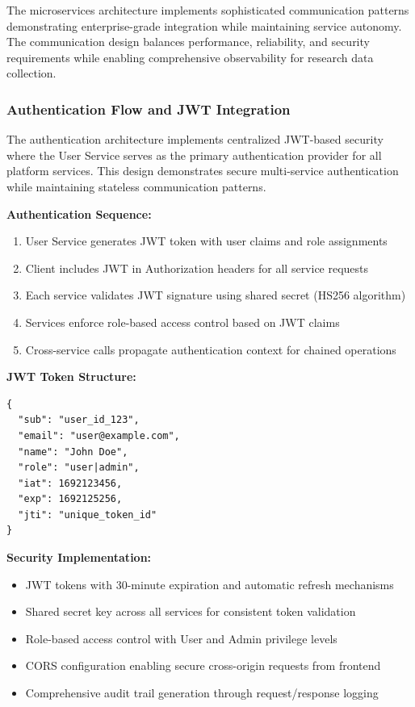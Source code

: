 The microservices architecture implements sophisticated communication patterns demonstrating enterprise-grade integration while maintaining service autonomy. The communication design balances performance, reliability, and security requirements while enabling comprehensive observability for research data collection.

\subsubsection{Authentication Flow and JWT Integration}

The authentication architecture implements centralized JWT-based security where the User Service serves as the primary authentication provider for all platform services. This design demonstrates secure multi-service authentication while maintaining stateless communication patterns.

\textbf{Authentication Sequence:}
\begin{enumerate}
\item User Service generates JWT token with user claims and role assignments
\item Client includes JWT in Authorization headers for all service requests
\item Each service validates JWT signature using shared secret (HS256 algorithm)
\item Services enforce role-based access control based on JWT claims
\item Cross-service calls propagate authentication context for chained operations
\end{enumerate}

\textbf{JWT Token Structure:}
\begin{verbatim}
{
  "sub": "user_id_123",
  "email": "user@example.com",
  "name": "John Doe", 
  "role": "user|admin",
  "iat": 1692123456,
  "exp": 1692125256,
  "jti": "unique_token_id"
}
\end{verbatim}

\textbf{Security Implementation:}
\begin{itemize}
\item JWT tokens with 30-minute expiration and automatic refresh mechanisms
\item Shared secret key across all services for consistent token validation
\item Role-based access control with User and Admin privilege levels
\item CORS configuration enabling secure cross-origin requests from frontend
\item Comprehensive audit trail generation through request/response logging
\end{itemize}

